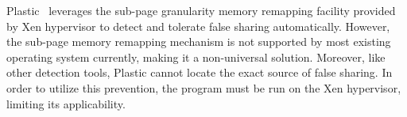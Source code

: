Plastic~\cite{OSdetection} leverages the sub-page granularity memory remapping facility
provided by Xen hypervisor to detect and tolerate false sharing automatically.
However, the sub-page memory remapping mechanism is not supported by most existing operating 
system currently, making it a non-universal solution. Moreover, like other
detection tools, Plastic cannot locate the exact source of false sharing.  
In order to utilize this prevention, the program must be run on the Xen hypervisor,
limiting its applicability.

